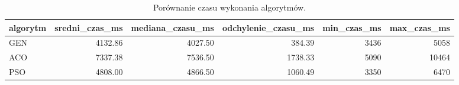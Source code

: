 \begin{table}
\caption{Porównanie czasu wykonania algorytmów.}
\label{tab:czas_wykonania}
\begin{tabular}{lrrrrr}
\toprule
algorytm & sredni_czas_ms & mediana_czasu_ms & odchylenie_czasu_ms & min_czas_ms & max_czas_ms \\
\midrule
GEN & 4132.86 & 4027.50 & 384.39 & 3436 & 5058 \\
ACO & 7337.38 & 7536.50 & 1738.33 & 5090 & 10464 \\
PSO & 4808.00 & 4866.50 & 1060.49 & 3350 & 6470 \\
\bottomrule
\end{tabular}
\end{table}
